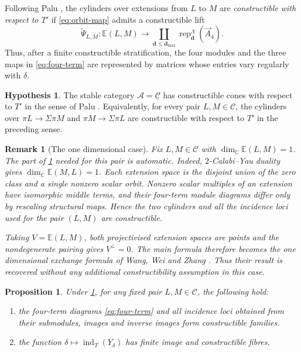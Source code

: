 \documentclass[11pt,reqno]{article}
\numberwithin{equation}{section}
\newtheorem{proposition}[proposition]{Proposition}
\newtheorem{remark}[remark]{Remark}
\theoremstyle{definition}
\newtheorem{Hypothesis}[Hypothesis]{Hypothesis}
\DeclareMathOperator{\ind}{ind}
\newcommand{\C}{\mathcal C}
\newcommand{\A}{\mathcal A}
\newcommand{\E}{\mathbb E}
\newcommand{\kk}{\mathbb C}
\begin{document}
Following Palu \cite[Section~1.3]{Palu2012}, the cylinders over extensions from
$L$ to $M$ are \emph{constructible with respect to $T'$} if
\eqref{eq:orbit-map} admits a constructible lift
\[
 \widetilde\Psi_{L,M}\colon\E(L,M)\longrightarrow
 \coprod_{\mathbf d\leq\mathbf d_{\max}}
 \operatorname{rep}^{\Lambda}_{\mathbf d}(\vec A_4).
\]
Thus, after a finite constructible stratification, the four modules and the
three maps in \eqref{eq:four-term} are represented by matrices whose entries
vary regularly with $\delta$.

\begin{Hypothesis}\label{hyp:constructible-cones}
The stable category $\A=\underline{\C}$ has constructible cones with respect to $T'$ in the sense of Palu \cite[Section~1.3]{Palu2012}. Equivalently, for every pair $L,M\in\C$, the cylinders over $\pi L\to\Sigma\pi M$ and $\pi M\to\Sigma\pi L$ are constructible with respect to $T'$ in the preceding sense.
\end{Hypothesis}

\begin{remark}[The one dimensional case]\label{rem:one-dimensional}
Fix $L,M\in\C$ with $\dim_{\kk}\E(L,M)=1$. The part of \cref{hyp:constructible-cones} needed for this pair is automatic. Indeed, $2$-Calabi--Yau duality gives $\dim_{\kk}\E(M,L)=1$. Each extension space is the disjoint union of the zero class and a single nonzero scalar orbit. Nonzero scalar multiples of an extension have isomorphic middle terms, and their four-term module diagrams differ only by rescaling structural maps. Hence the two cylinders and all the incidence loci used for the pair $(L,M)$ are constructible.

Taking $V=\E(L,M)$, both projectivised extension spaces are points and the nondegenerate pairing gives $V^{\perp}=0$. The main formula therefore becomes the one dimensional exchange formula of Wang, Wei and Zhang \cite[Theorem~4.4]{WangWeiZhangCC}. Thus their result is recovered without any additional constructibility assumption in this case.
\end{remark}



\begin{proposition}\label{prop:constructible-lift}
Under \cref{hyp:constructible-cones}, for any fixed pair $L,M\in\C$, the following hold:
\begin{enumerate}[label=\textup{(\roman*)},leftmargin=2.6em]
\item the four-term diagrams \eqref{eq:four-term} and all incidence loci obtained from their submodules, images and inverse images form constructible families.
\item the function $\delta\mapsto\ind_T(Y_\delta)$ has finite image and constructible fibres.
\end{enumerate}
\end{proposition}
\end{document}
